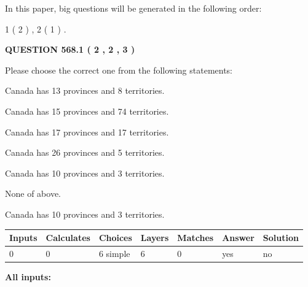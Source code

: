 \documentclass[12pt]{article}
\begin{document}
In this paper, big questions will be generated in the following order: 
   
   
   1 ( 2 )
 ,
   2 ( 1 )
 .
  
\vspace{0.2in}
  
{\textbf{\Large{QUESTION
568.1 
 ( 2 , 2 , 3 )
}}}
  
  
Please choose the correct one from the following statements:
 
 
Canada has  13 provinces and  8 territories.
 
 
Canada has  15 provinces and  74 territories.
 
 
Canada has  17 provinces and  17 territories.
 
 
Canada has  26 provinces and  5 territories.
 
 
Canada has 10  provinces and 3 territories.
 
 
 None of above.
 
 
\noindent{}
 
 
Canada has 10  provinces and 3 territories.
 
 
\noindent{}
 
 
   
   
   
   
\noindent\begin{tabular}{|l|l|l|l|l|l|l|}
 \hline
Inputs & Calculates & Choices & Layers & Matches & Answer & Solution \\ \hline
 0  & 
 0  & 
 6
  simple  
  & 
 6  & 
 0  & 
  yes & 
  no 
  \\ \hline
 \end{tabular}
   
   
   
   
\noindent{}
   
   
   
   
\noindent\vspace{0.1in}\hspace{-0.08in} {\textbf{\Large{All inputs: }}}
   
\end{document}

